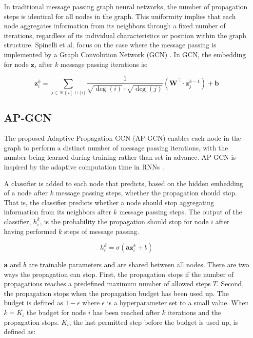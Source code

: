 \documentclass{gdl}
\begin{document}
In traditional message passing graph neural networks, the number of propagation steps is identical for all nodes in the graph. This uniformity implies that each node aggregates information from its neighbors through a fixed number of iterations, regardless of its individual characteristics or position within the graph structure. Spinelli et al. focus on the case where the message passing is implemented by a Graph Convolution Network (GCN) \cite{kipf2017}. In GCN, the embedding for node $\mathbf{z}_i$ after $k$ message passing iterations is:

\begin{equation}
\mathbf{z}_i^{k} = \sum_{j \in \mathcal{N}(i) \cup \{i\}} \frac{1}{\sqrt{\deg(i)} \cdot \sqrt{\deg(j)}} \left( \mathbf{W}^\top \cdot \mathbf{z}_j^{k-1} \right) + \mathbf{b}
\end{equation}

\subsection{AP-GCN}
The proposed Adaptive Propagation GCN (AP-GCN) enables each node in the graph to perform a distinct number of message passing iterations, with the number being learned during training rather than set in advance. AP-GCN is inspired by the adaptive computation time in RNNs \cite{graves2017}.

A classifier is added to each node that predicts, based on the hidden embedding of a node after $k$ message passing steps, whether the propagation should stop. That is, the classifier predicts whether a node should stop aggregating information from its neighbors after $k$ message passing steps. The output of the classifier, $h^k_i$, is the probability the propagation should stop for node $i$ after having performed $k$ steps of message passing.

\begin{equation}
h^k_i = \sigma(\textbf{a}\textbf{z}^k_i + b)
\end{equation}

\noindent $\textbf{a}$ and $b$ are trainable parameters and are shared between all nodes. There are two ways the propagation can stop. First, the propagation stops if the number of propagations reaches a predefined maximum number of allowed steps $T$. Second, the propagation stops when the propagation budget has been used up. The budget is defined as $1-\epsilon$ where $\epsilon$ is a hyperparameter set to a small value. When $k=K_i$ the budget for node $i$ has been reached after $k$ iterations and the propagation stops. $K_i$, the last permitted step before the budget is used up, is defined as:
\end{document}
